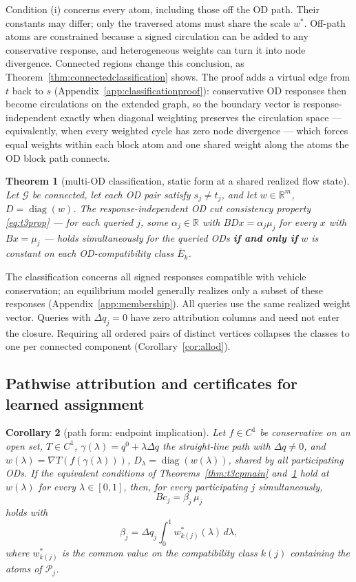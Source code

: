 \documentclass[a4paper,fleqn]{cas-sc}
\newtheorem{theorem}{Theorem}
\newtheorem{corollary}[theorem]{Corollary}
\newcommand{\R}{\mathbb{R}}
\begin{document}
Condition (i) concerns every atom, including those off the OD path. Their
constants may differ; only the traversed atoms must share the scale $w^*$.
Off-path atoms are constrained because a signed circulation can
be added to any conservative response, and heterogeneous weights can turn
it into node divergence. Connected regions change this conclusion, as
Theorem~\ref{thm:connectedclassification} shows. The proof adds a virtual
edge from $t$ back to $s$
(Appendix~\ref{app:classificationproof}): conservative OD responses then
become circulations on the extended graph, so the boundary vector is
response-independent exactly when diagonal weighting preserves the
circulation space --- equivalently, when every weighted cycle has zero
node divergence --- which forces equal weights within each block atom
and one shared weight along the atoms the OD block path connects.

\begin{theorem}[multi-OD classification, static form at a shared
realized flow state]\label{thm:t3cm}
Let $\mathcal{G}$ be connected, let each OD pair satisfy $s_j\ne t_j$,
and let $w\in\R^m$, $D=\operatorname{diag}(w)$. The
response-independent OD cut consistency property \eqref{eq:t3prop}
--- for each queried $j$, some $\alpha_j\in\R$ with
$BDx=\alpha_j\mu_j$ for every $x$ with $Bx=\mu_j$ --- holds
simultaneously for the queried ODs \textbf{if and only if} $w$ is
constant on each OD-compatibility class $\bar{E}_k$.
\end{theorem}

The classification concerns all signed responses compatible with vehicle
conservation; an equilibrium model generally realizes only a subset of
these responses (Appendix~\ref{app:membership}).
All queries use the same realized weight vector. Queries with $\Delta q_j=0$
have zero attribution columns and need not enter the closure. Requiring all
ordered pairs of distinct vertices collapses the classes to one per
connected component (Corollary~\ref{cor:allod}).

\subsection{Pathwise attribution and certificates for learned assignment}\label{sec:pathwise}
\begin{corollary}[path form: endpoint implication]\label{cor:path}
Let $f\in C^1$ be conservative on an open set, $T\in C^1$,
$\gamma(\lambda)=q^0+\lambda\Delta q$ the straight-line path with $\Delta q\ne0$, and
$w(\lambda)=\nabla T(f(\gamma(\lambda)))$, $D_\lambda=\operatorname{diag}(w(\lambda))$, shared by
all participating ODs. If the equivalent conditions of
Theorems~\ref{thm:t3cpmain} and~\ref{thm:t3cm} hold at $w(\lambda)$ for
every $\lambda\in[0,1]$, then, for every participating $j$
simultaneously,
\[
Bc_j=\beta_j\,\mu_j
\]
holds with
\[
\beta_j=\Delta q_j\int_0^1 w^*_{k(j)}(\lambda)\,d\lambda,
\]
where $w^*_{k(j)}$
is the common value on the compatibility class $k(j)$ containing the
atoms of $\mathcal{P}_j$.
\end{corollary}
\end{document}
